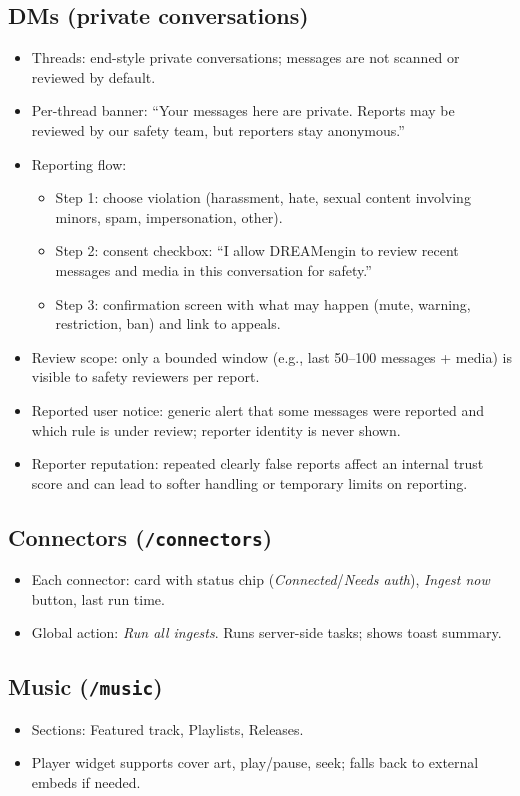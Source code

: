 \documentclass[11pt]{article}
\begin{document}
\subsection{DMs (private conversations)}
\begin{itemize}
  \item Threads: end-style private conversations; messages are not scanned or reviewed by default.
  \item Per-thread banner: ``Your messages here are private. Reports may be reviewed by our safety team, but reporters stay anonymous.''
  \item Reporting flow:
    \begin{itemize}
      \item Step 1: choose violation (harassment, hate, sexual content involving minors, spam, impersonation, other).
      \item Step 2: consent checkbox: ``I allow DREAMengin to review recent messages and media in this conversation for safety.''
      \item Step 3: confirmation screen with what may happen (mute, warning, restriction, ban) and link to appeals.
    \end{itemize}
  \item Review scope: only a bounded window (e.g., last 50--100 messages + media) is visible to safety reviewers per report.
  \item Reported user notice: generic alert that some messages were reported and which rule is under review; reporter identity is never shown.
  \item Reporter reputation: repeated clearly false reports affect an internal trust score and can lead to softer handling or temporary limits on reporting.
\end{itemize}

\subsection{Connectors (\texttt{/connectors})}
\begin{itemize}
  \item Each connector: card with status chip (\emph{Connected}/\emph{Needs auth}), \emph{Ingest now} button, last run time.
  \item Global action: \emph{Run all ingests}. Runs server-side tasks; shows toast summary.
\end{itemize}

\subsection{Music (\texttt{/music})}
\begin{itemize}
  \item Sections: Featured track, Playlists, Releases.
  \item Player widget supports cover art, play/pause, seek; falls back to external embeds if needed.
\end{itemize}
\end{document}
